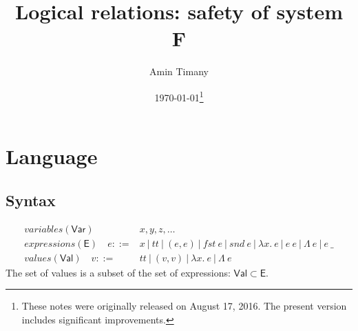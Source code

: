 \documentclass{article}
\title{Logical relations: safety of system F}
\author{Amin Timany}
\date{\today \footnote{These notes were originally released on August 17, 2016. The present version includes significant improvements.}}
\newcommand{\gor}{~|~}
\newcommand{\fst}{\mathit{fst}}
\newcommand{\snd}{\mathit{snd}}
\newcommand{\TT}{\mathit{tt}}
\newcommand{\VAR}{\mathsf{Var}}
\newcommand{\EXP}{\mathsf{E}}
\newcommand{\VAL}{\mathsf{Val}}
\newcommand{\TArg}{\_}
\newcommand{\TLam}{\Lambda}
\newcommand{\expr}{e}
\newcommand{\val}{v}
\newcommand{\var}{x}
\newcommand{\varB}{y}
\newcommand{\varC}{z}
\begin{document}
\maketitle


\section{Language}
\subsection{Syntax}
\begin{align*}
\textit{variables} (\VAR) \hspace{1em} \phantom{\var ::={}}& \var, \varB, \varC, \dots\\
\textit{expressions} (\EXP) \hspace{1em} \expr ::={}& \var \gor \TT \gor (\expr, \expr)
\gor \fst~\expr \gor \snd~\expr \gor \lambda \var.~\expr \gor \expr~\expr
\gor \TLam~\expr \gor \expr~\TArg\\
\textit{values} (\VAL) \hspace{1em} \val ::={}& \TT \gor (\val, \val) \gor \lambda \var.~\expr
\gor \TLam~\expr
\end{align*}
The set of values is a subset of the set of expressions: $\VAL \subset \EXP$.
\end{document}

